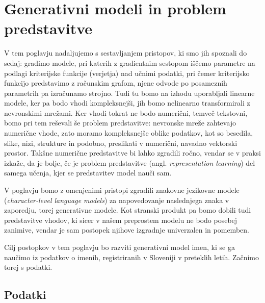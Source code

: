 \chapter{Generativni modeli in problem predstavitve}

V tem poglavju nadaljujemo s sestavljanjem pristopov, ki smo jih spoznali do sedaj: gradimo modele, pri katerih z gradientnim sestopom iščemo parametre na podlagi kriterijske funkcije (verjetja) nad učnimi podatki, pri čemer kriterijsko funkcijo predstavimo z računskim grafom, njene odvode po posameznih parametrih pa izračunamo strojno. Tudi tu bomo na izhodu uporabljali linearne modele, ker pa bodo vhodi kompleksnejši, jih bomo nelinearno transformirali z nevronskimi mrežami. Ker vhodi tokrat ne bodo numerični, temveč tekstovni, bomo pri tem reševali še problem predstavitve: nevronske mreže zahtevajo numerične vhode, zato moramo kompleksnejše oblike podatkov, kot so besedila, slike, nizi, strukture in podobno, preslikati v numerični, navadno vektorski prostor. Takšne numerične predstavitve bi lahko zgradili ročno, vendar se v praksi izkaže, da je bolje, če je problem predstavitve (angl. \textit{representation learning}) 
%
%
del samega učenja, kjer se predstavitev model nauči sam.

V poglavju bomo z omenjenimi pristopi zgradili znakovne jezikovne modele (\textit{character-level language models}) za napovedovanje naslednjega znaka v zaporedju, torej generativne modele.
%
%
Kot stranski produkt pa bomo dobili tudi predstavitve vhodov, ki sicer v našem preprostem modelu ne bodo posebej zanimive, vendar je sam postopek njihove izgradnje univerzalen in pomemben.

Cilj postopkov v tem poglavju bo razviti generativni model imen, ki se ga naučimo iz podatkov o imenih, registriranih v Sloveniji v preteklih letih. Začnimo torej s podatki.

\vspace*{5mm}
\section{Podatki}

